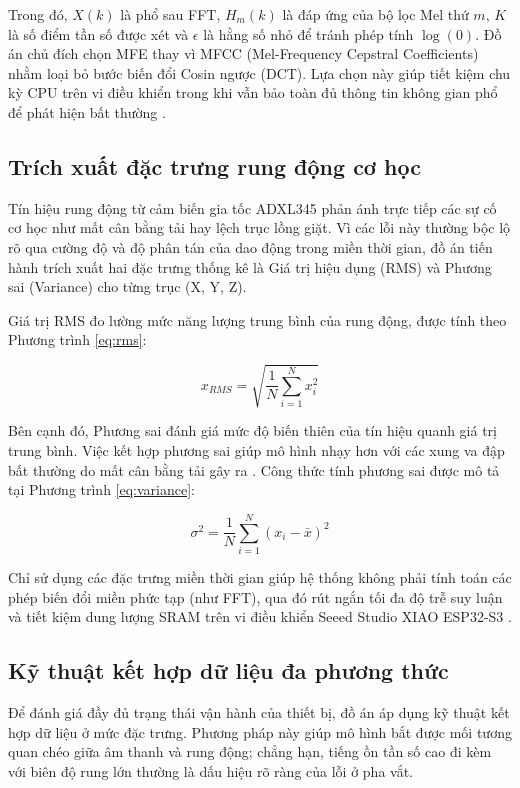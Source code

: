 Trong đó, $X(k)$ là phổ sau FFT, $H_m(k)$ là đáp ứng của bộ lọc Mel thứ $m$, $K$ là số điểm tần số được xét và $\epsilon$ là hằng số nhỏ để tránh phép tính $\log(0)$. Đồ án chủ đích chọn MFE thay vì MFCC (Mel-Frequency Cepstral Coefficients) nhằm loại bỏ bước biến đổi Cosin ngược (DCT). Lựa chọn này giúp tiết kiệm chu kỳ CPU trên vi điều khiển trong khi vẫn bảo toàn đủ thông tin không gian phổ để phát hiện bất thường \cite{ref_1_1, ref_1_12}.

\subsection{Trích xuất đặc trưng rung động cơ học}

Tín hiệu rung động từ cảm biến gia tốc ADXL345 phản ánh trực tiếp các sự cố cơ học như mất cân bằng tải hay lệch trục lồng giặt. Vì các lỗi này thường bộc lộ rõ qua cường độ và độ phân tán của dao động trong miền thời gian, đồ án tiến hành trích xuất hai đặc trưng thống kê là Giá trị hiệu dụng (RMS) và Phương sai (Variance) cho từng trục (X, Y, Z).

Giá trị RMS đo lường mức năng lượng trung bình của rung động, được tính theo Phương trình \ref{eq:rms}:

\begin{equation}
\label{eq:rms}
x_{RMS} = \sqrt{\frac{1}{N} \sum_{i=1}^{N} x_i^2}
\end{equation}

Bên cạnh đó, Phương sai đánh giá mức độ biến thiên của tín hiệu quanh giá trị trung bình. Việc kết hợp phương sai giúp mô hình nhạy hơn với các xung va đập bất thường do mất cân bằng tải gây ra \cite{ref_1_3}. Công thức tính phương sai được mô tả tại Phương trình \ref{eq:variance}:

\begin{equation}
\label{eq:variance}
\sigma^2 = \frac{1}{N} \sum_{i=1}^{N} (x_i - \bar{x})^2
\end{equation}

Chỉ sử dụng các đặc trưng miền thời gian giúp hệ thống không phải tính toán các phép biến đổi miền phức tạp (như FFT), qua đó rút ngắn tối đa độ trễ suy luận và tiết kiệm dung lượng SRAM trên vi điều khiển Seeed Studio XIAO ESP32-S3 \cite{ref_1_11}.

\subsection{Kỹ thuật kết hợp dữ liệu đa phương thức}

Để đánh giá đầy đủ trạng thái vận hành của thiết bị, đồ án áp dụng kỹ thuật kết hợp dữ liệu ở mức đặc trưng. Phương pháp này giúp mô hình bắt được mối tương quan chéo giữa âm thanh và rung động; chẳng hạn, tiếng ồn tần số cao đi kèm với biên độ rung lớn thường là dấu hiệu rõ ràng của lỗi ở pha vắt.

